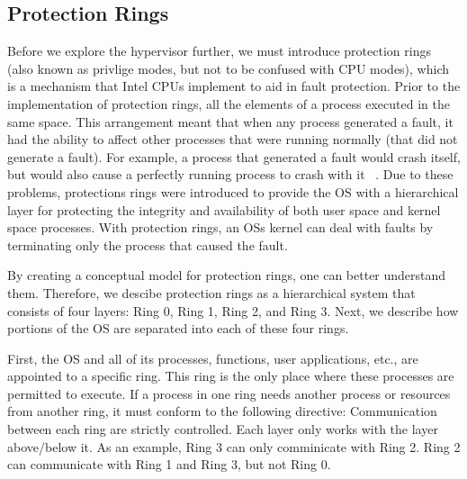 \documentclass{report}
\begin{document}
\begin{spacing}{1.5}
\newpage
\vfill
\begin{figure}[ht]
  \caption{}
\end{figure}


\subsection{Protection Rings}

{\large
Before we explore the hypervisor further, we must introduce protection rings (also known as privlige modes, but not to be confused with CPU modes), which is a mechanism that Intel CPUs implement to aid in fault protection. Prior to the implementation of protection rings, all the elements of a process executed in the same space. This arrangement meant that when any process generated a fault, it had the ability to affect other processes that were running normally (that did not generate a fault). For example, a process that generated a fault would crash itself, but would also cause a perfectly running process to crash with it ~\cite{Wiley2011}. Due to these problems, protections rings were introduced to provide the OS with a hierarchical layer for protecting the integrity and availability of both user space and kernel space processes. With protection rings, an OSs kernel can deal with faults by terminating only the process that caused the fault. 
\newline
}

{\large
By creating a conceptual model for protection rings, one can better understand them. Therefore, we descibe protection rings as a hierarchical system that consists of four layers: Ring 0, Ring 1, Ring 2, and Ring 3. Next, we describe how portions of the OS are separated into each of these four rings.
\newline
}

{\large
First, the OS and all of its processes, functions, user applications, etc., are appointed to a specific ring. This ring is the only place where these processes are permitted to execute. If a process in one ring needs another process or resources from another ring, it must conform to the following directive:
\newline
Communication between each ring are strictly controlled. Each layer only works with the layer above/below it. As an example, Ring 3 can only comminicate with Ring 2. Ring 2 can communicate with Ring 1 and Ring 3, but not Ring 0.
\newline
}


\end{spacing}
\end{document}
